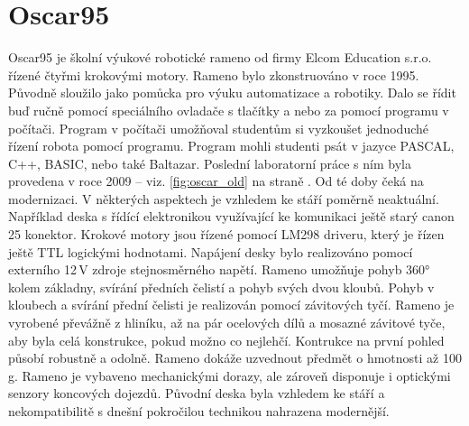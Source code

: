 \chapter{Oscar95}

Oscar95 je školní výukové robotické rameno od firmy Elcom Education s.r.o. řízené čtyřmi krokovými motory. Rameno bylo zkonstruováno v roce 1995. Původně sloužilo jako pomůcka pro výuku automatizace a robotiky. Dalo se řídit buď ručně pomocí speciálního ovladače s tlačítky a nebo za pomocí programu v počítači. Program v počítači umožňoval studentům si vyzkoušet jednoduché řízení robota pomocí programu. Program mohli studenti psát v jazyce PASCAL, C++, BASIC, nebo také Baltazar. Poslední laboratorní práce s ním byla provedena v roce 2009 -- viz. \ref{fig:oscar_old}  na straně 
\pageref{fig:oscar_old}. Od té doby čeká na modernizaci. V některých aspektech je vzhledem ke stáří poměrně neaktuální.
Například deska s řídící elektronikou využívající ke komunikaci ještě starý canon 25 konektor. Krokové motory jsou řízené pomocí LM298 driveru, který je řízen ještě TTL logickými hodnotami. Napájení desky bylo realizováno pomocí externího 12\,V zdroje stejnosměrného napětí. Rameno umožňuje pohyb 360° kolem základny, svírání předních čelistí a pohyb svých dvou kloubů. Pohyb v kloubech a svírání přední čelisti je realizován pomocí závitových tyčí. Rameno je vyrobené převážně z hliníku, až na pár ocelových dílů a mosazné závitové tyče, aby byla celá konstrukce, pokud možno co nejlehčí. Kontrukce na první pohled působí robustně a odolně. Rameno dokáže uzvednout předmět o hmotnosti až 100 g. Rameno je vybaveno mechanickými dorazy, ale zároveň disponuje i optickými senzory koncových dojezdů. Původní deska byla vzhledem ke stáří a nekompatibilitě s dnešní pokročilou technikou nahrazena modernější. \cite{Oscar95} \cite{staveb-robot} \cite{Laborka-2009}

		

